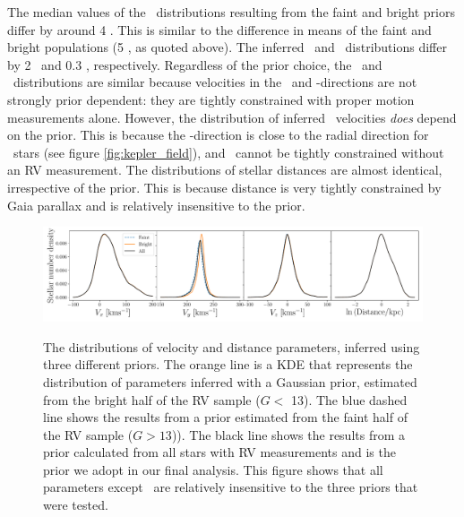 The median values of the \vy\ distributions resulting from the faint and
bright priors differ by around 4 \kms.
This is similar to the difference in means of the faint and bright populations
(5 \kms, as quoted above).
The inferred \vx\ and \vz\ distributions differ by 2 \kms\ and 0.3 \kms,
respectively.
Regardless of the prior choice, the \vx\ and \vz\ distributions are similar
because velocities in the \x\ and \z-directions are not strongly prior
dependent: they are tightly constrained with proper motion measurements alone.
However, the distribution of inferred \vy\ velocities {\it does} depend on the
prior.
This is because the \y-direction is close to the radial direction for \kepler\
stars (see figure \ref{fig:kepler_field}), and \vy\ cannot be tightly
constrained without an RV measurement.
The distributions of stellar distances are almost identical, irrespective of
the prior.
This is because distance is very tightly constrained by Gaia parallax and is
relatively insensitive to the prior.
\begin{figure}[ht!]
\caption{
The distributions of velocity and distance parameters, inferred using three
    different priors.
The orange line is a KDE that represents the distribution of parameters
    inferred with a Gaussian prior, estimated from the bright half of the RV
    sample ($G < $ 13).
The blue dashed line shows the results from a prior estimated from the faint
    half of the RV sample ($G > 13$)).
The black line shows the results from a prior calculated from all stars with
    RV measurements and is the prior we adopt in our final analysis.
    This figure shows that all parameters except \vy\ are relatively
    insensitive to the three priors that were tested.
    }
  \centering
    \includegraphics[width=1\textwidth]{prior_comparison}
\label{fig:prior_comparison}
\end{figure}


